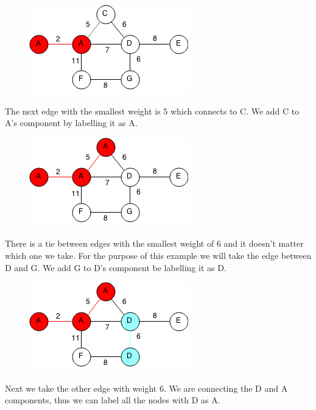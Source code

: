 \documentclass[11pt,oneside]{book}
\makeatletter
\def\maxwidth#1{\ifdim\Gin@nat@width>#1 #1\else\Gin@nat@width\fi}
\makeatother
\begin{document}
\vspace{5px}\begin{figure}[H]\centering
        \includegraphics[width=0.66\maxwidth{\textwidth}]{kruskal2.png}
        \end{figure}

The next edge with the smallest weight is 5 which connects to C. We add C to A's component by labelling it as A.

\vspace{5px}\begin{figure}[H]\centering
        \includegraphics[width=0.66\maxwidth{\textwidth}]{kruskal3.png}
        \end{figure}

There is a tie between edges with the smallest weight of 6 and it doesn't matter which one we take. For the purpose of this example we will take the edge between D and G. We add G to D's component be labelling it as D.

\vspace{5px}\begin{figure}[H]\centering
        \includegraphics[width=0.66\maxwidth{\textwidth}]{kruskal4.png}
        \end{figure}

Next we take the other edge with weight 6. We are connecting the D and A components, thus we can label all the nodes with D as A.
\end{document}
